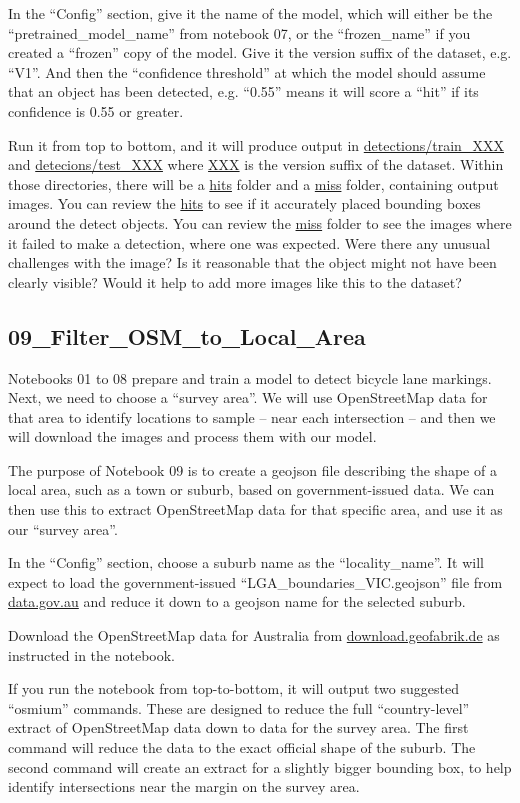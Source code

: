 \documentclass[11pt,twoside]{report}
\begin{document}
In the ``Config'' section, give it the name of the model, which will either be the ``pretrained\_model\_name'' from notebook 07, or the ``frozen\_name'' if you created a ``frozen'' copy of the model.  Give it the version suffix of the dataset, e.g. ``V1''.  And then the ``confidence threshold'' at which the model should assume that an object has been detected, e.g. ``0.55'' means it will score a ``hit'' if its confidence is 0.55 or greater.

Run it from top to bottom, and it will produce output in \url{detections/train_XXX} and \url{detecions/test_XXX} where \url{XXX} is the version suffix of the dataset.  Within those directories, there will be a \url{hits} folder and a \url{miss} folder, containing output images.  You can review the \url{hits} to see if it accurately placed bounding boxes around the detect objects.  You can review the \url{miss} folder to see the images where it failed to make a detection, where one was expected.  Were there any unusual challenges with the image?  Is it reasonable that the object might not have been clearly visible?  Would it help to add more images like this to the dataset?


\subsection{09\_Filter\_OSM\_to\_Local\_Area}
\label{a09}

Notebooks 01 to 08 prepare and train a model to detect bicycle lane markings.  Next, we need to choose a ``survey area''.  We will use OpenStreetMap data for that area to identify locations to sample -- near each intersection -- and then we will download the images and process them with our model.

The purpose of Notebook 09 is to create a geojson file describing the shape of a local area, such as a town or suburb, based on government-issued data.  We can then use this to extract OpenStreetMap data for that specific area, and use it as our ``survey area''.

In the ``Config'' section, choose a suburb name as the ``locality\_name''.  It will expect to load the government-issued ``LGA\_boundaries\_VIC.geojson'' file from \url{data.gov.au} and reduce it down to a geojson name for the selected suburb.

Download the OpenStreetMap data for Australia from \url{download.geofabrik.de} as instructed in the notebook.

If you run the notebook from top-to-bottom, it will output two suggested ``osmium'' commands.  These are designed to reduce the full ``country-level'' extract of OpenStreetMap data down to data for the survey area.  The first command will reduce the data to the exact official shape of the suburb.  The second command will create an extract for a slightly bigger bounding box, to help identify intersections near the margin on the survey area.
\end{document}
